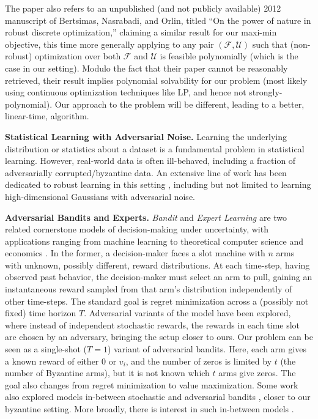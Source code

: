 The paper \cite{selection_minmax_regret_randomized} also refers to an unpublished (and not publicly available) 2012 manuscript of Bertsimas, Nasrabadi, and Orlin, titled ``On the power of nature in robust discrete optimization,'' claiming a similar result for our maxi-min objective, this time more generally applying to any pair $(\mathcal{F}, \mathcal{U})$ such that (non-robust) optimization over both $\mathcal{F}$ and $\mathcal{U}$ is feasible polynomially (which is the case in our setting). Modulo the fact that their paper cannot be reasonably retrieved, their result implies polynomial solvability for our problem (most likely using continuous optimization techniques like LP, and hence not strongly-polynomial). Our approach to the problem will be different, leading to a better, linear-time, algorithm.

\noindent \textbf{Statistical Learning with Adversarial Noise.} Learning the underlying distribution or statistics about a dataset is a fundamental problem in statistical learning. However, real-world data is often ill-behaved, including a fraction of adversarially corrupted/byzantine data. An extensive line of work has been dedicated to robust learning in this setting \cite{robust_mean_covariance_1, robust_geometric_concept_classes, robust_gaussians_1, robust_gaussians_2, learning_from_untrusted_data}, including but not limited to learning high-dimensional Gaussians with adversarial noise.

\noindent \textbf{Adversarial Bandits and Experts.} \emph{Bandit} and \emph{Expert Learning} are two related cornerstone models of decision-making under uncertainty, with applications ranging from machine learning to theoretical computer science and economics \cite{bandits1, bandits2, bandits3}. In the former, a decision-maker faces a slot machine with $n$ arms with unknown, possibly different, reward distributions. At each time-step, having observed past behavior, the decision-maker must select an arm to pull, gaining an instantaneous reward sampled from that arm's distribution independently of other time-steps.
The standard goal is regret minimization across a (possibly not fixed) time horizon $T$. Adversarial variants of the model have been explored, where instead of independent stochastic rewards, the rewards in each time slot are chosen by an adversary, bringing the setup closer to ours. Our problem can be seen as a single-shot ($T = 1$) variant of adversarial bandits. Here, each arm gives a known reward of either $0$ or $v_i$, and the number of zeros is limited by $t$ (the number of Byzantine arms), but it is not known which $t$ arms give zeros. The goal also changes from regret minimization to value maximization. Some work also explored models in-between stochastic and adversarial bandits \cite{stochastic_adversarial_bandits,stochastic_adversarial_bandits_2}, closer to our byzantine setting.
More broadly, there is interest in such in-between models \cite{stochastic_adversarial}.

